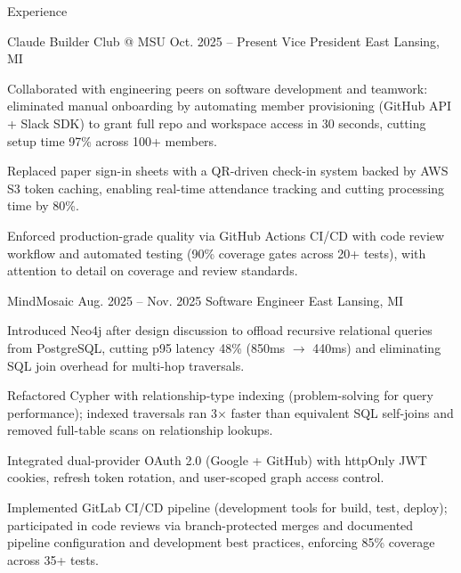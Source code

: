 \documentclass[
	11pt
]{../../../resume}
\begin{document}
	\begin{rSection}{E}{xperience}
		\begin{rSectionEntry}
			{Claude Builder Club @ MSU}
			{Oct. 2025 -- Present}
			{Vice President}
			{}
			{East Lansing, MI}

			\item Collaborated with engineering peers on software development and teamwork: eliminated manual onboarding by automating member provisioning (GitHub API + Slack SDK) to grant full repo and workspace access in 30 seconds, cutting setup time 97\% across 100+ members.
			\item Replaced paper sign-in sheets with a QR-driven check-in system backed by AWS S3 token caching, enabling real-time attendance tracking and cutting processing time by 80\%.
			\item Enforced production-grade quality via GitHub Actions CI/CD with code review workflow and automated testing (90\% coverage gates across 20+ tests), with attention to detail on coverage and review standards.
		\end{rSectionEntry}

		\begin{rSectionEntry}
			{MindMosaic}
			{Aug. 2025 -- Nov. 2025}
			{Software Engineer}
			{}
			{East Lansing, MI}

			\item Introduced Neo4j after design discussion to offload recursive relational queries from PostgreSQL, cutting p95 latency 48\% (850ms $\rightarrow$ 440ms) and eliminating SQL join overhead for multi-hop traversals.
			\item Refactored Cypher with relationship-type indexing (problem-solving for query performance); indexed traversals ran 3$\times$ faster than equivalent SQL self-joins and removed full-table scans on relationship lookups.
			\item Integrated dual-provider OAuth 2.0 (Google + GitHub) with httpOnly JWT cookies, refresh token rotation, and user-scoped graph access control.
			\item Implemented GitLab CI/CD pipeline (development tools for build, test, deploy); participated in code reviews via branch-protected merges and documented pipeline configuration and development best practices, enforcing 85\% coverage across 35+ tests.
		\end{rSectionEntry}
	\end{rSection}
\end{document}
